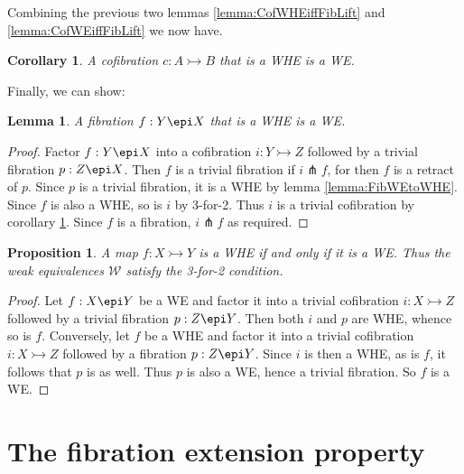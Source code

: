 \documentclass[11pt]{article}
\newcommand{\mono}{\ensuremath{\rightarrowtail}}
\newtheorem{proposition}[theorem]{Proposition}
\newtheorem{lemma}[theorem]{Lemma}
\newtheorem{corollary}[theorem]{Corollary}
\theoremstyle{remark}
\theoremstyle{definition}
\begin{document}
Combining the previous two lemmas \ref{lemma:CofWHEiffFibLift} and \ref{lemma:CofWEiffFibLift} we now have.
\begin{corollary}\label{cor:CofWHEtoWE}
A cofibration $ c : A \mono B$ that is a WHE is a WE.
\end{corollary}

Finally, we can show:

\begin{lemma}\label{lemma:FibWHEtoWE}
A fibration $ f : Y \epi X$ that is a WHE is a WE.
\end{lemma}
\begin{proof}
Factor $ f : Y \epi X$ into a cofibration $i : Y\mono Z$ followed by a trivial fibration $p: Z\epi X$.  Then $f$ is a trivial fibration if $i\pitchfork f$, for then $f$ is a retract of $p$.  Since $p$ is a trivial fibration, it is a WHE by lemma \ref{lemma:FibWEtoWHE}.  Since $f$ is also a WHE, so is $i$ by 3-for-2.  Thus $i$ is a trivial cofibration by corollary \ref{cor:CofWHEtoWE}. Since $f$ is a fibration, $i\pitchfork f$ as required.
\end{proof}

\begin{proposition}\label{prop:WHEiffWE}
A map $ f : X \mono Y$ is a WHE if and only if it is a WE.  Thus the weak equivalences $\mathcal{W}$ satisfy the 3-for-2 condition.
\end{proposition}
\begin{proof}
Let $ f : X \epi Y$ be a WE and factor it into a trivial cofibration $i : X\mono Z$ followed by a trivial fibration $p: Z\epi Y$.  Then both 
$i$ and $p$ are WHE, whence so is $f$.  Conversely, let $f$ be a WHE and factor it into a trivial cofibration $i : X\mono Z$ followed by a fibration $p: Z\epi Y$. Since  $i$ is then a WHE, as is $f$, it follows that $p$ is as well.  Thus $p$ is also a WE, hence a trivial fibration. So $f$ is a WE.
\end{proof}

\section{The fibration extension property}


\end{document}
